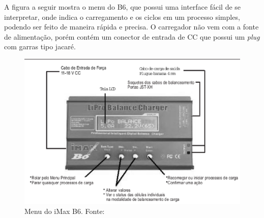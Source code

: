 A figura a seguir mostra o menu do B6, que possui uma interface fácil de se interpretar, onde indica o carregamento e os ciclos em um processo simples, podendo ser feito de maneira rápida e precisa. O carregador não vem com a fonte de alimentação, porém contém um conector de entrada de CC que possui um \textit{plug} com garras tipo jacaré.

 \begin{figure}[H]
    \centering
	\includegraphics[keepaspectratio=true,scale=0.5]{figuras/manual.eps}
    \caption{Menu do iMax B6. Fonte: \cite{ibmax}}
\end{figure}
